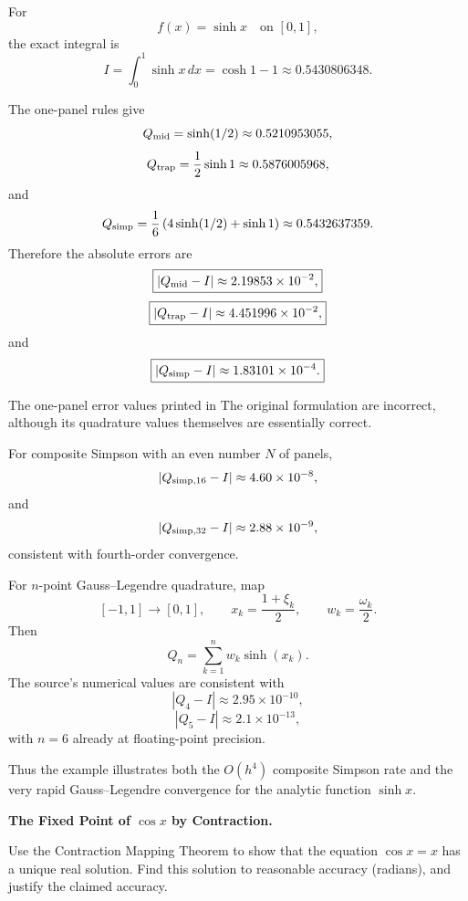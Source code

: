 \begin{solution}
For
\[
f(x)=\sinh x
\quad\text{on }[0,1],
\]
the exact integral is
\[
\boxed{
I
=
\int_0^1\sinh x\,dx
=
\cosh1-1
\approx0.5430806348.
}
\]

The one-panel rules give
\[
Q_{\rm mid}
=
\sinh(1/2)
\approx0.5210953055,
\]
\[
Q_{\rm trap}
=
\frac12\sinh1
\approx0.5876005968,
\]
and
\[
Q_{\rm simp}
=
\frac16
\left(
4\sinh(1/2)+\sinh1
\right)
\approx0.5432637359.
\]
Therefore the absolute errors are
\[
\boxed{
|Q_{\rm mid}-I|
\approx2.19853\times10^{-2},
}
\]
\[
\boxed{
|Q_{\rm trap}-I|
\approx4.451996\times10^{-2},
}
\]
and
\[
\boxed{
|Q_{\rm simp}-I|
\approx1.83101\times10^{-4}.
}
\]

The one-panel error values printed in The original formulation are incorrect, although its
quadrature values themselves are essentially correct.

For composite Simpson with an even number \(N\) of panels,
\[
|Q_{{\rm simp},16}-I|
\approx4.60\times10^{-8},
\]
and
\[
|Q_{{\rm simp},32}-I|
\approx2.88\times10^{-9},
\]
consistent with fourth-order convergence.

For \(n\)-point Gauss--Legendre quadrature, map
\[
[-1,1]\to[0,1],
\qquad
x_k=\frac{1+\xi_k}{2},
\qquad
w_k=\frac{\omega_k}{2}.
\]
Then
\[
Q_n
=
\sum_{k=1}^{n}
w_k\sinh(x_k).
\]
The source's numerical values are consistent with
\[
|Q_4-I|
\approx2.95\times10^{-10},
\]
\[
|Q_5-I|
\approx2.1\times10^{-13},
\]
with \(n=6\) already at floating-point precision.

Thus the example illustrates both the \(O(h^4)\) composite Simpson rate and the very rapid
Gauss--Legendre convergence for the analytic function \(\sinh x\).
\end{solution}


\begin{problem}[CP-II-0461]
\label{prob:cp-ii-0461}
\textbf{The Fixed Point of \(\cos x\) by Contraction.}

\hspace*{1.5em}Use the Contraction Mapping Theorem to show that the equation $\cos x=x$ has a unique real
solution. Find this solution to reasonable accuracy (radians), and justify the claimed accuracy.
\end{problem}

